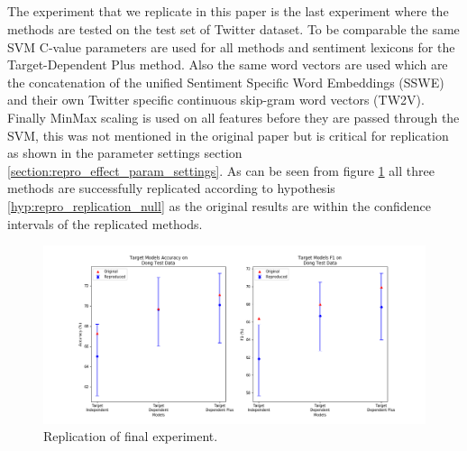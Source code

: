 \subsection{\cite{repro_vo_2015}}
The experiment that we replicate in this paper is the last experiment where the methods are tested on the test set of \citet{repro_dong_2014} Twitter dataset. To be comparable the same SVM C-value parameters are used for all methods and sentiment lexicons for the Target-Dependent Plus method. Also the same word vectors are used which are the concatenation of the unified Sentiment Specific Word Embeddings (SSWE) \citep{repro_tang_2014} and their own Twitter specific continuous skip-gram \citep{repro_mikolov_2013} word vectors (TW2V). Finally MinMax scaling is used on all features before they are passed through the SVM, this was not mentioned in the original paper but is critical for replication as shown in the parameter settings section \ref{section:repro_effect_param_settings}. As can be seen from figure \ref{fig:repro_vo_method} all three methods are successfully replicated according to hypothesis \ref{hyp:repro_replication_null} as the original results are within the confidence intervals of the replicated methods.

\begin{figure}
    \centering
    \includegraphics[scale=0.55]{images/reproducibility/Replication_Cases/Target_Replication_Dong.png}
    \caption{Replication of \citet{repro_vo_2015} final experiment.}
    \label{fig:repro_vo_method}
\end{figure}

